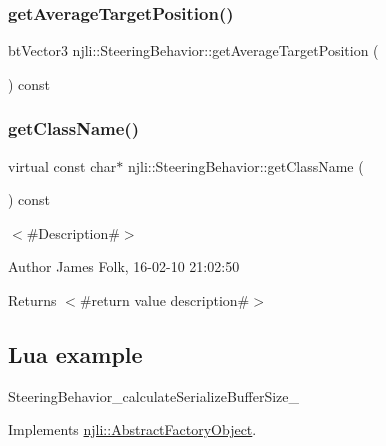 \subsubsection{\texorpdfstring{get\+Average\+Target\+Position()}{getAverageTargetPosition()}}
{\footnotesize\ttfamily bt\+Vector3 njli\+::\+Steering\+Behavior\+::get\+Average\+Target\+Position (\begin{DoxyParamCaption}{ }\end{DoxyParamCaption}) const\hspace{0.3cm}{\ttfamily [protected]}}

\mbox{\label{classnjli_1_1_steering_behavior_abb58d6982dc295fc3e90f096f51b0ef8}} 
\subsubsection{\texorpdfstring{get\+Class\+Name()}{getClassName()}}
{\footnotesize\ttfamily virtual const char$\ast$ njli\+::\+Steering\+Behavior\+::get\+Class\+Name (\begin{DoxyParamCaption}{ }\end{DoxyParamCaption}) const\hspace{0.3cm}{\ttfamily [virtual]}}



$<$\#\+Description\#$>$ 

\begin{DoxyAuthor}{Author}
James Folk, 16-\/02-\/10 21\+:02\+:50
\end{DoxyAuthor}
\begin{DoxyReturn}{Returns}
$<$\#return value description\#$>$
\end{DoxyReturn}
\hypertarget{classnjli_1_1_steering_behavior_wander_ex1}{}\subsection{Lua example}\label{classnjli_1_1_steering_behavior_wander_ex1}

\begin{DoxyCodeInclude}
\end{DoxyCodeInclude}
Steering\+Behavior\+\_\+calculate\+Serialize\+Buffer\+Size\+\_\+ 

Implements \mbox{\hyperlink{classnjli_1_1_abstract_factory_object_af4151e41b80d5bc3fc42822c67fc2278}{njli\+::\+Abstract\+Factory\+Object}}.



